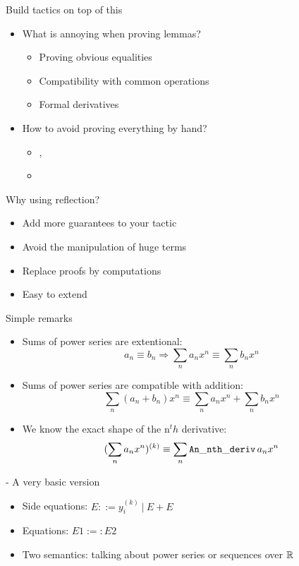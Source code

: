 \documentclass{beamer}
\begin{document}
\begin{frame}{Build tactics on top of this}
\begin{itemize}
  \item What is annoying when proving lemmas?
  \begin{itemize}
    \item Proving obvious equalities
    \item Compatibility with common operations
    \item Formal derivatives
  \end{itemize}
  \item How to avoid proving everything by hand?
  \begin{itemize}
    \item \ring{}, \field{}
    \item \solve{}
  \end{itemize}
\end{itemize}
\end{frame}

\begin{frame}{Why using reflection?}
\begin{itemize}
 \item Add more guarantees to your tactic
 \item Avoid the manipulation of huge terms
 \item Replace proofs by computations
 \item Easy to extend
\end{itemize}
\end{frame}

\begin{frame}{Simple remarks}
\begin{itemize}
  \item Sums of power series are extentional:
    $$a_n \equiv b_n \Rightarrow
   \sum_n a_n x^ n \equiv \sum_n b_n x ^ n$$
  \item Sums of power series are compatible with addition:
    $$\sum_n (a_n + b_n) x^ n \equiv \sum_n a_n x ^ n + \sum_n b_n x ^ n$$
  \item We know the exact shape of the n$^th$ derivative:
    $$(\sum_n a_n x^ n)^{(k)} \equiv \sum_n \operatorname{\mathtt{An\_nth\_deriv}} a_n x ^ n$$
\end{itemize}
\end{frame}

\begin{frame}{\solve{} - A very basic version}
\begin{itemize}
 \item Side equations: $E ::= y_i^{(k)} ~|~ E + E$
 \item<2-> Equations: $E1 :=: E2$
 \item<3-> Two semantics: talking about power series or sequences over $\mathbb{R}$
\end{itemize}
\end{frame}
\end{document}
